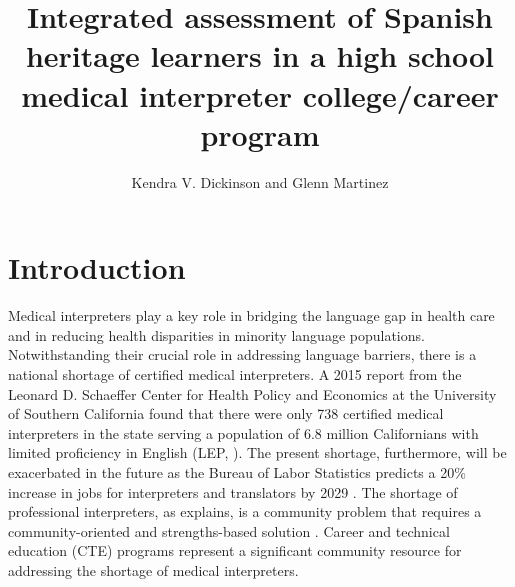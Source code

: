\documentclass[output=paper]{langscibook}
\author{Kendra V. Dickinson\affiliation{Rutgers University} and Glenn Martinez\affiliation{University of Texas at San Antonio}}
\title{Integrated assessment of Spanish heritage learners in a high school medical interpreter college/career program}
\begin{document}
\maketitle

\section{Introduction}

Medical interpreters play a key role in bridging the language gap in health care and in reducing health disparities in minority language populations. Notwithstanding their crucial role in addressing language barriers, there is a national shortage of certified medical interpreters. A 2015 report from the Leonard D. Schaeffer Center for Health Policy and Economics at the University of Southern California found that there were only 738 certified medical interpreters in the state serving a population of 6.8 million Californians with limited proficiency in English (LEP, \citealt{Gonzales2015}). The present shortage, furthermore, will be exacerbated in the future as the Bureau of Labor Statistics predicts a 20\% increase in jobs for interpreters and translators by 2029 \citep{BureauofLaborStatistics2020}. The shortage of professional interpreters, as \citet{Dwyer2001} explains, is a community problem that requires a community-oriented and strengths-based solution \citep{Delgado-Romero2018}. Career and technical education (CTE) programs represent a significant community resource for addressing the shortage of medical interpreters.
\end{document}
